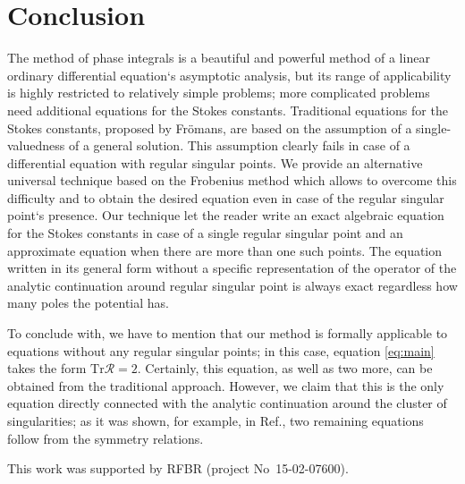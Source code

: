 \documentclass[aip,jmp,reprint]{revtex4-1}
\def\R{\bm{\mathcal{R}}}
\def\Tr{\mathrm{Tr}}
\begin{document}
\section{Conclusion \label{sec:con}}
The method of phase integrals is a beautiful and powerful method of a linear ordinary 
differential equation`s asymptotic analysis, but its range of applicability is highly 
restricted to relatively simple problems; more complicated problems need additional equations 
for the Stokes constants. Traditional equations for the Stokes constants, proposed by Fr\"omans\cite{frpaper},
are based on the assumption of a single-valuedness of a general solution. This assumption clearly fails
in case of a differential equation with regular singular points. We provide an alternative universal
technique based on the Frobenius method which allows to overcome this difficulty and to obtain the 
desired equation even in case of the regular singular point`s presence. 
Our technique let the reader write an exact algebraic equation for the Stokes constants in case
of a single regular singular point and an approximate equation when there are more than one such points.
The equation written in its general form without a specific representation of the operator of the analytic
continuation around regular singular point is always exact regardless how many poles the potential has. 

To conclude with, we have to mention that our method is formally applicable to equations without any regular
singular points; in this case, equation \eqref{eq:main} takes the form $\Tr \R = 2$. Certainly, this equation,
as well as two more, can be obtained from the traditional approach\cite{frbook}. However, we claim that this is the only equation
directly connected with the analytic continuation around the cluster of singularities; as it was shown,
for example, in Ref., two remaining equations follow from the symmetry relations.

\begin{acknowledgments}
This work was supported by RFBR (project No~15-02-07600).
\end{acknowledgments}
\end{document}
